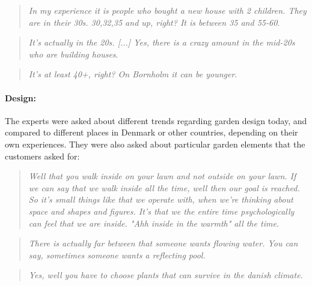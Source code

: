 		\begin{quote}
			\textit{In my experience it is people who bought a new house with 2 children. They are in their 30s. 30,32,35 and up, right? It is between 35 and 55-60}\label{quote:expertClients2}.\\
		\end{quote}
		
		\begin{quote}
			\textit{It's actually in the 20s. [...] Yes, there is a crazy amount in the mid-20s who are building houses}\label{quote:expertClients3}.\\
		\end{quote}
		
		\begin{quote}
			\textit{It's at least 40+, right? On Bornholm it can be younger}\label{quote:expertClients4}.\\
		\end{quote}
		
		\paragraph*{Design:}
		The experts were asked about different trends regarding garden design today, and compared to different places in Denmark or other countries, depending on their own experiences. They were also asked about particular garden elements that the customers asked for:\\
		\begin{quote}
			\textit{Well that you walk inside on your lawn and not outside on your lawn. If we can say that we walk inside all the time, well then our goal is reached. So it's small things like that we operate with, when we're thinking about space and shapes and figures. It's that we the entire time psychologically can feel that we are inside. "Ahh inside in the warmth" all the time.}\label{quote:expertDesign1}
		\end{quote}
		
		\begin{quote}
			\textit{There is actually far between that someone wants flowing water. You can say, sometimes someone wants a reflecting pool.}\label{quote:expertDesign2}\\
		\end{quote}
	
		\begin{quote}
			\textit{Yes, well you have to choose plants that can survive in the danish climate.}\label{quote:expertDesign3}\\
		\end{quote}
		
